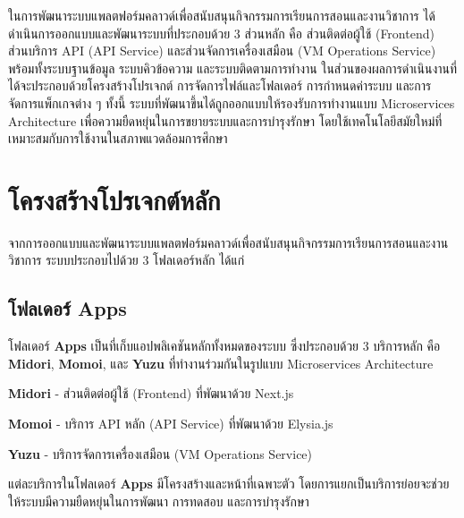 
\hspace*{1.5em}
ในการพัฒนาระบบแพลตฟอร์มคลาวด์เพื่อสนับสนุนกิจกรรมการเรียนการสอนและงานวิชาการ ได้ดำเนินการออกแบบและพัฒนาระบบที่ประกอบด้วย 3 ส่วนหลัก คือ ส่วนติดต่อผู้ใช้ (Frontend) ส่วนบริการ API (API Service) และส่วนจัดการเครื่องเสมือน (VM Operations Service) 
พร้อมทั้งระบบฐานข้อมูล ระบบคิวข้อความ และระบบติดตามการทำงาน ในส่วนของผลการดำเนินงานที่ได้จะประกอบด้วยโครงสร้างโปรเจกต์ การจัดการไฟล์และโฟลเดอร์ การกำหนดค่าระบบ และการจัดการแพ็กเกจต่าง ๆ 
ทั้งนี้ ระบบที่พัฒนาขึ้นได้ถูกออกแบบให้รองรับการทำงานแบบ Microservices Architecture เพื่อความยืดหยุ่นในการขยายระบบและการบำรุงรักษา โดยใช้เทคโนโลยีสมัยใหม่ที่เหมาะสมกับการใช้งานในสภาพแวดล้อมการศึกษา
\section{โครงสร้างโปรเจกต์หลัก}
\hspace*{1.5em}
จากการออกแบบและพัฒนาระบบแพลตฟอร์มคลาวด์เพื่อสนับสนุนกิจกรรมการเรียนการสอนและงานวิชาการ ระบบประกอบไปด้วย 3 โฟลเดอร์หลัก ได้แก่ 

\subsection{โฟลเดอร์ Apps}
\hspace*{1.5em}
โฟลเดอร์ \textbf{Apps} เป็นที่เก็บแอปพลิเคชันหลักทั้งหมดของระบบ ซึ่งประกอบด้วย 3 บริการหลัก คือ \textbf{Midori}, \textbf{Momoi}, และ \textbf{Yuzu} ที่ทำงานร่วมกันในรูปแบบ Microservices Architecture 
\begin{mycustomenum2}
  \item \textbf{Midori} - ส่วนติดต่อผู้ใช้ (Frontend) ที่พัฒนาด้วย Next.js
  \item \textbf{Momoi} - บริการ API หลัก (API Service) ที่พัฒนาด้วย Elysia.js  
  \item \textbf{Yuzu} - บริการจัดการเครื่องเสมือน (VM Operations Service)
\end{mycustomenum2}
\hspace*{1.5em}
แต่ละบริการในโฟลเดอร์ \textbf{Apps} มีโครงสร้างและหน้าที่เฉพาะตัว โดยการแยกเป็นบริการย่อยจะช่วยให้ระบบมีความยืดหยุ่นในการพัฒนา การทดสอบ และการบำรุงรักษา

